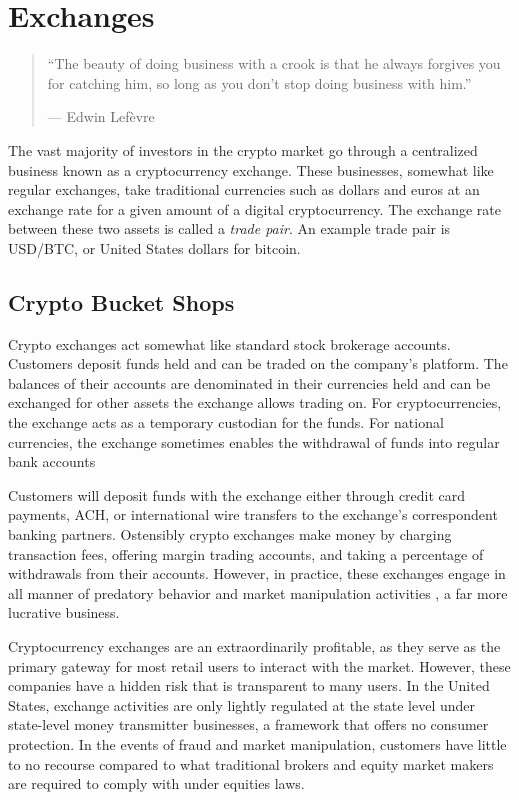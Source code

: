 \chapter{Exchanges}

\begin{quote}
``The beauty of doing business with a crook is that he always forgives you for
  catching him, so long as you don't stop doing business with him.''
\begin{flushright}
--- Edwin Lefèvre
\end{flushright}
\end{quote}

The vast majority of investors in the crypto market go through a centralized
business known as a cryptocurrency exchange. These businesses, somewhat like
regular exchanges, take traditional currencies such as dollars and euros at an
exchange rate for a given amount of a digital cryptocurrency. The exchange rate
between these two assets is called a \textit{trade pair}. An example trade pair
is USD/BTC, or United States dollars for bitcoin.

\section{Crypto Bucket Shops}


Crypto exchanges act somewhat like standard stock brokerage accounts. Customers
deposit funds held and can be traded on the company's platform. The balances of
their accounts are denominated in their currencies held and can be exchanged for
other assets the exchange allows trading on. For cryptocurrencies, the exchange
acts as a temporary custodian for the funds. For national currencies, the
exchange sometimes enables the withdrawal of funds into regular bank accounts
\cite{white_cryptocurrency_2022}

Customers will deposit funds with the exchange either through credit card
payments, ACH, or international wire transfers to the exchange's correspondent
banking partners. Ostensibly crypto exchanges make money by charging transaction
fees, offering margin trading accounts, and taking a percentage of withdrawals
from their accounts. However, in practice, these exchanges engage in all manner
of predatory behavior and market manipulation activities
\cite{ranger_anatomy_2022}, a far more lucrative business.

Cryptocurrency exchanges are an extraordinarily profitable, as they serve as the
primary gateway for most retail users to interact with the market. However,
these companies have a hidden risk that is transparent to many users. In the
United States, exchange activities are only lightly regulated
\cite{cumming_regulation_2019} at the state level under state-level money
transmitter businesses, a framework that offers no consumer protection. In the
events of fraud and market manipulation, customers have little to no recourse
compared to what traditional brokers and equity market makers are required to
comply with under equities laws.

